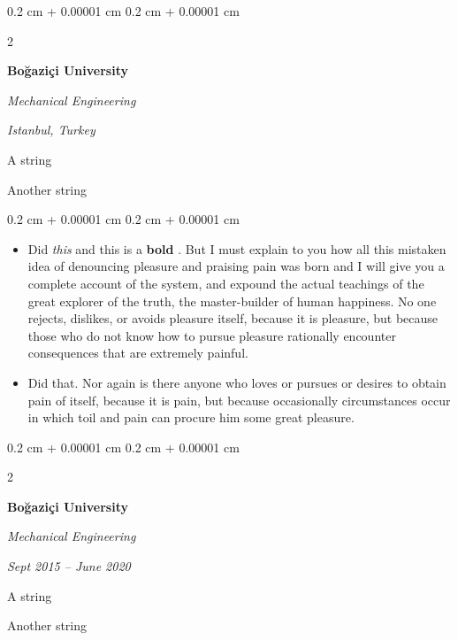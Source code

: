 \documentclass[10pt, letterpaper]{article}
\newenvironment{summary}{
    \begin{description}[
        topsep=0.10 cm,
        parsep=0.10 cm,
        partopsep=0pt,
        itemsep=0pt,
        leftmargin=0.4 cm + 10pt
    ]
}{
    \end{description}
} %
\newenvironment{highlights}{
    \begin{itemize}[
        topsep=0.10 cm,
        parsep=0.10 cm,
        partopsep=0pt,
        itemsep=0pt,
        leftmargin=0.4 cm + 10pt
    ]
}{
    \end{itemize}
} %
\newenvironment{onecolentry}{
    \begin{adjustwidth}{
        0.2 cm + 0.00001 cm
    }{
        0.2 cm + 0.00001 cm
    }
}{
    \end{adjustwidth}
} %
\newenvironment{twocolentry}[2][]{
    \onecolentry
    \def\secondColumn{#2}
    \setcolumnwidth{\fill, 4.5 cm}
    \begin{paracol}{2}
}{
    \switchcolumn \raggedleft \secondColumn
    \end{paracol}
    \endonecolentry
} %
\let\hrefWithoutArrow\href
\renewcommand{\href}[2]{\hrefWithoutArrow{#1}{\ifthenelse{\equal{#2}{}}{ }{#2 }\raisebox{.15ex}{\footnotesize \faExternalLink*}}}
\begin{document}
        \begin{twocolentry}{
        \textit{Istanbul, Turkey}    
            
        }
            \textbf{Boğaziçi University}

            \textit{Mechanical Engineering}
        \end{twocolentry}
            \begin{summary}
                \item A string
                \item Another string
            \end{summary}
        \vspace{0.10 cm}
        \begin{onecolentry}
            \begin{highlights}
                \item Did \textit{this} and this is a \textbf{bold} \href{https://example.com}{link}. But I must explain to you how all this mistaken idea of denouncing pleasure and praising pain was born and I will give you a complete account of the system, and expound the actual teachings of the great explorer of the truth, the master-builder of human happiness. No one rejects, dislikes, or avoids pleasure itself, because it is pleasure, but because those who do not know how to pursue pleasure rationally encounter consequences that are extremely painful.
                \item Did that. Nor again is there anyone who loves or pursues or desires to obtain pain of itself, because it is pain, but because occasionally circumstances occur in which toil and pain can procure him some great pleasure.
            \end{highlights}
        \end{onecolentry}


        \vspace{0.2 cm}

        \begin{twocolentry}{
            
            
        \textit{Sept 2015 – June 2020}}
            \textbf{Boğaziçi University}

            \textit{Mechanical Engineering}
        \end{twocolentry}
            \begin{summary}
                \item A string
                \item Another string
            \end{summary}
\end{document}
